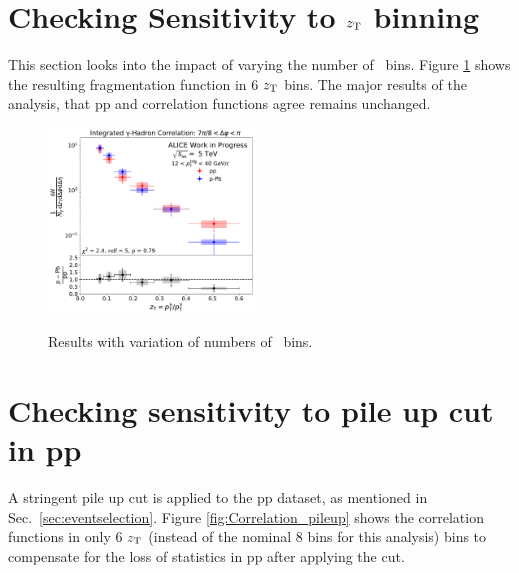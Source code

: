 
\section{Checking Sensitivity to $z_{\mathrm{T}}$ binning}
This section looks into the impact of varying the number of \zt~bins. Figure \ref{fig:FF_zT_Rebin} shows the resulting fragmentation function in 6 $z_{\mathrm{T}}$ bins. The major results of the analysis, that pp and \pPb correlation functions agree remains unchanged.


\begin{figure}[hbtp]
\centering
\includegraphics[width=0.49\textwidth]{G-H_New/zT_Rebin_6_006zT06zTITSSub/Final_FFunction_and_Ratio.pdf}
\label{fig:FF_zT_Rebin}
\caption{Results with variation of numbers of \zt~bins.}
\end{figure}



\section{Checking sensitivity to pile up cut in pp}
A stringent pile up cut is applied to the pp dataset, as mentioned in Sec.~\ref{sec:eventselection}. Figure \ref{fig:Correlation_pileup} shows the correlation functions in only 6 $z_{\mathrm{T}}$ (instead of the nominal 8 bins for this analysis) bins to compensate for the loss of statistics in pp after applying the cut.

